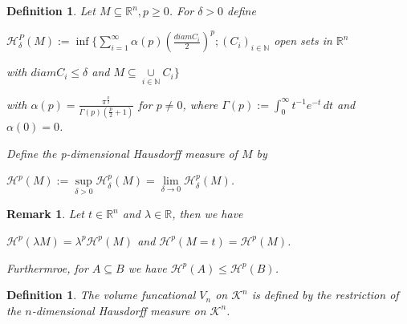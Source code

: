 \documentclass[a4paper]{book}
\newtheorem{remark}[theorem]{Remark}%
\newtheorem{definition}[theorem]{Definition}%
\numberwithin{theorem}{section}%
\begin{document}
\begin{definition}
    Let $M\subseteq\mathbb{R}^{n}, p\geq0$. For $\delta>0$ define
    \begin{center}
        $\displaystyle \mathscr{H}_{\delta}^{P}(M):=\inf\{\sum\limits_{i=1}^{\infty}\alpha(p)(\frac{diam C_{i}}{2})^{p};(C_{i})_{i\in\mathbb{N}}$ open sets in $\mathbb{R}^n$

        \hspace{1cm}with $diam C_{i}\leq\delta$ and $M\subseteq\underset{i\in\mathbb{N}}{\cup}{C_{i}}\}$
    \end{center}
    with $\alpha(p)=\frac{\pi^{\frac{p}{2}}}{\Gamma(p)(\frac{p}{2}+1)}$ for $p\neq0$, where $\Gamma(p):=\int_{0}^{\infty}t^{-1}e^{-t}\,dt$ and $\alpha(0)=0$.
    
    Define the p-dimensional Hausdorff measure of $M$ by
    \begin{center}
        $\mathscr{H}^{p}(M):=\underset{\delta>0}{\sup}\mathscr{H}_{\delta}^{p}(M)=\underset{\delta\to0}{\lim}\mathscr{H}_{\delta}^{p}(M)$.
    \end{center}
\end{definition}

\begin{remark}
    Let $t\in\mathbb{R}^{n}$ and $\lambda\in\mathbb{R}$, then we have
    \begin{center}
        $\mathscr{H}^{p}(\lambda M)=\lambda^{p}\mathscr{H}^{p}(M)$ and $\mathscr{H}^{p}(M=t)=\mathscr{H}^{p}(M)$.
    \end{center}
    Furthermroe, for $A\subseteq B$ we have $\mathscr{H}^{p}(A)\leq\mathscr{H}^{p}(B)$.
\end{remark}

\begin{definition}
    The volume funcational $V_{n}$ on $\mathscr{K}^{n}$ is defined by the restriction of the $n$-dimensional Hausdorff measure on $\mathscr{K}^{n}$.
\end{definition}
\end{document}
